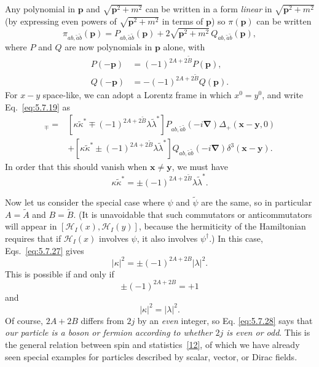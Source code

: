 Any polynomial in $\mathbf p$ and $\sqrt{\mathbf p^2+m^2}$ can be written in a
form \emph{linear} in $\sqrt{\mathbf p^2+m^2}$ (by expressing even powers of
$\sqrt{\mathbf p^2+m^2}$ in terms of $\mathbf p$) so $\pi(\mathbf p)$ can be
written
\begin{equation}
\pi_{ab,\tilde a\tilde b}(\mathbf p)=P_{ab,\tilde a\tilde b}(\mathbf p)
+2\sqrt{\mathbf p^2+m^2}\,Q_{ab,\tilde a\tilde b}(\mathbf p),
\tag{5.7.24}\label{eq:5.7.24}
\end{equation}
where $P$ and $Q$ are now polynomials in $\mathbf p$ alone, with
\begin{align}
P(-\mathbf p)&=(-1)^{2A+2\widetilde B}P(\mathbf p),
\tag{5.7.25}\label{eq:5.7.25}\\
Q(-\mathbf p)&=-(-1)^{2A+2\widetilde B}Q(\mathbf p).
\tag{5.7.26}\label{eq:5.7.26}
\end{align}
For $x-y$ space-like, we can adopt a Lorentz frame in which $x^0=y^0$, and
write Eq.~\eqref{eq:5.7.19} as
\begin{align*}
[\psi_{ab}(x),\widetilde\psi^\dagger_{\tilde a\tilde b}(y)]_\mp
={}&[\kappa\widetilde\kappa^*\mp
(-1)^{2A+2\widetilde B}\lambda\widetilde\lambda^*]
P_{ab,\tilde a\tilde b}(-i\boldsymbol\nabla)\Delta_+(\mathbf x-\mathbf y,0)
\\
&+[\kappa\widetilde\kappa^*\pm
(-1)^{2A+2\widetilde B}\lambda\widetilde\lambda^*]
Q_{ab,\tilde a\tilde b}(-i\boldsymbol\nabla)\delta^3(\mathbf x-\mathbf y).
\end{align*}
In order that this should vanish when $\mathbf x\neq\mathbf y$, we must have
\begin{equation}
\kappa\widetilde\kappa^*=\pm(-1)^{2A+2\widetilde B}
\lambda\widetilde\lambda^*.
\tag{5.7.27}\label{eq:5.7.27}
\end{equation}

Now let us consider the special case where $\psi$ and $\widetilde\psi$ are the
same, so in particular $A=\widetilde A$ and $B=\widetilde B$. (It is
unavoidable that such commutators or anticommutators will appear in
$[\mathcal H_I(x),\mathcal H_I(y)]$, because the hermiticity of the Hamiltonian
requires that if $\mathcal H_I(x)$ involves $\psi$, it also involves
$\psi^\dagger$.) In this case, Eqs.~\eqref{eq:5.7.27} gives
\[
|\kappa|^2=\pm(-1)^{2A+2B}|\lambda|^2.
\]
This is possible if and only if
\begin{equation}
\pm(-1)^{2A+2B}=+1
\tag{5.7.28}\label{eq:5.7.28}
\end{equation}
and
\begin{equation}
|\kappa|^2=|\lambda|^2.
\tag{5.7.29}\label{eq:5.7.29}
\end{equation}
Of course, $2A+2B$ differs from $2j$ by an \emph{even} integer, so Eq.
\eqref{eq:5.7.28} says that \emph{our particle is a boson or fermion according to
whether $2j$ is even or odd}. This is the general relation between spin and
statistics~\hyperref[ref:5.12]{[12]}, of which we have already seen special examples for particles
described by scalar, vector, or Dirac fields.

